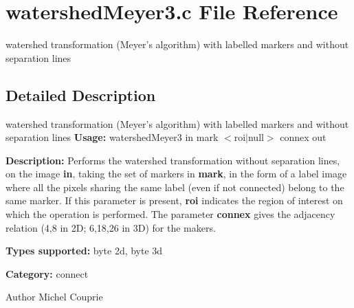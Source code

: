 \section{watershedMeyer3.c File Reference}
\label{watershedMeyer3_8c}


watershed transformation (Meyer's algorithm) with labelled markers and without separation lines  




\subsection{Detailed Description}
watershed transformation (Meyer's algorithm) with labelled markers and without separation lines {\bfseries Usage:} watershedMeyer3 in mark $<$roi$|$null$>$ connex out

{\bfseries Description:} Performs the watershed transformation without separation lines, on the image {\bfseries in}, taking the set of markers in {\bfseries mark}, in the form of a label image where all the pixels sharing the same label (even if not connected) belong to the same marker. If this parameter is present, {\bfseries roi} indicates the region of interest on which the operation is performed. The parameter {\bfseries connex} gives the adjacency relation (4,8 in 2D; 6,18,26 in 3D) for the makers.

{\bfseries Types supported:} byte 2d, byte 3d

{\bfseries Category:} connect

\begin{DoxyAuthor}{Author}
Michel Couprie 
\end{DoxyAuthor}
